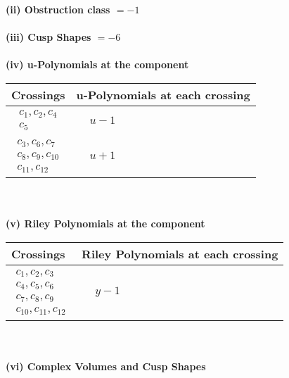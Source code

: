 \documentclass[1p]{elsarticle_modified}
\theoremstyle{definition}
\begin{document}
\flushleft \textbf{(ii) Obstruction class $= -1$}\\~\\
\flushleft \textbf{(iii) Cusp Shapes $= -6$}\\~\\
\newpage\renewcommand{\arraystretch}{1}
\flushleft \textbf{(iv) u-Polynomials at the component}\newline \\
\begin{tabular}{m{50pt}|m{274pt}}
Crossings & \hspace{64pt}u-Polynomials at each crossing \\
\hline $$\begin{aligned}c_{1},c_{2},c_{4}\\c_{5}\end{aligned}$$&$\begin{aligned}
&u-1
\end{aligned}$\\
\hline $$\begin{aligned}c_{3},c_{6},c_{7}\\c_{8},c_{9},c_{10}\\c_{11},c_{12}\end{aligned}$$&$\begin{aligned}
&u+1
\end{aligned}$\\
\hline
\end{tabular}\\~\\
\newpage\renewcommand{\arraystretch}{1}
\flushleft \textbf{(v) Riley Polynomials at the component}\newline \\
\begin{tabular}{m{50pt}|m{274pt}}
Crossings & \hspace{64pt}Riley Polynomials at each crossing \\
\hline $$\begin{aligned}c_{1},c_{2},c_{3}\\c_{4},c_{5},c_{6}\\c_{7},c_{8},c_{9}\\c_{10},c_{11},c_{12}\end{aligned}$$&$\begin{aligned}
&y-1
\end{aligned}$\\
\hline
\end{tabular}\\~\\
\newpage\flushleft \textbf{(vi) Complex Volumes and Cusp Shapes}
\end{document}
